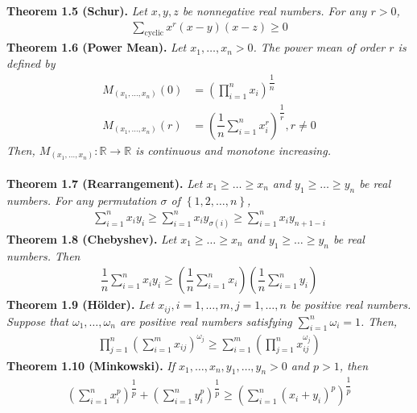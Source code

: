 \documentclass[a4paper,oneside]{article}
\numberwithin{equation}{section}
\begin{document}
\textbf{Theorem 1.5 (Schur).} \textit{Let $x,y,z$ be nonnegative real numbers. For any $r>0$,}
\begin{align}
\sum\limits_{\mbox{cyclic}} {{x^r}\left( {x - y} \right)\left( {x - z} \right)}  \ge 0
\end{align}
\textbf{Theorem 1.6 (Power Mean).} \textit{Let $x_1,\ldots,x_n >0$. The power mean of order $r$ is defined by}
\begin{align}
{M_{\left( {{x_1}, \ldots ,{x_n}} \right)}}\left( 0 \right) &= {\left( {\prod\limits_{i = 1}^n {{x_i}} } \right)^{\dfrac{1}{n}}}\\
{M_{\left( {{x_1}, \ldots ,{x_n}} \right)}}\left( r \right) &= {\left( {\dfrac{1}{n}}{\sum\limits_{i = 1}^n {x_i^r} } \right)^{\dfrac{1}{r}}},r \ne 0
\end{align}
\textit{Then, ${M_{\left( {{x_1}, \ldots ,{x_n}} \right)}}:\mathbb{R} \to \mathbb{R}$ is continuous and monotone increasing.}\\
\\
\textbf{Theorem 1.7 (Rearrangement).} \textit{Let $x_1 \ge \ldots \ge x_n$ and $y_1 \ge \ldots \ge y_n$ be real numbers. For any permutation $\sigma$ of $\left\{ {1,2, \ldots ,n} \right\}$,}
\begin{align}
\sum\limits_{i = 1}^n {{x_i}{y_i}}  \ge \sum\limits_{i = 1}^n {{x_i}{y_{\sigma \left( i \right)}}}  \ge \sum\limits_{i = 1}^n {{x_i}{y_{n + 1 - i}}} 
\end{align}
\textbf{Theorem 1.8 (Chebyshev).} \textit{Let $x_1 \ge \ldots \ge x_n$ and $y_1 \ge \ldots \ge y_n$ be real numbers. Then}
\begin{align}
\dfrac{1}{n}\sum\limits_{i = 1}^n {{x_i}{y_i}}  \ge \left( {\dfrac{1}{n}\sum\limits_{i = 1}^n {{x_i}} } \right)\left( {\dfrac{1}{n}\sum\limits_{i = 1}^n {{y_i}} } \right)
\end{align}
\textbf{Theorem 1.9 (H\"{o}lder).} \textit{Let $x_{ij},i=1,\ldots,m,j=1,\ldots,n$ be positive real numbers. Suppose that ${\omega _1}, \ldots ,{\omega _n}$ are positive real numbers satisfying $\sum\limits_{i = 1}^n {{\omega _i}}  = 1$. Then,}
\begin{align}
\prod\limits_{j = 1}^n {{{\left( {\sum\limits_{i = 1}^m {{x_{ij}}} } \right)}^{{\omega _j}}}}  \ge \sum\limits_{i = 1}^m {\left( {\prod\limits_{j = 1}^n {x_{ij}^{{\omega _j}}} } \right)} 
\end{align}
\textbf{Theorem 1.10 (Minkowski).} \textit{If $x_1,\ldots,x_n,y_1,\ldots,y_n >0$ and $p>1$, then}
\begin{align}
{\left( {\sum\limits_{i = 1}^n {x_i^p} } \right)^{\dfrac{1}{p}}} + {\left( {\sum\limits_{i = 1}^n {y_i^p} } \right)^{\dfrac{1}{p}}} \ge {\left( {\sum\limits_{i = 1}^n {{{\left( {{x_i} + {y_i}} \right)}^p}} } \right)^{\dfrac{1}{p}}}
\end{align}
\end{document}
